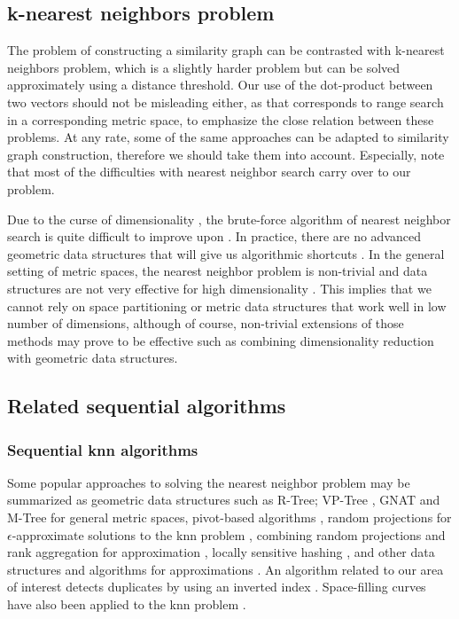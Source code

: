 \documentclass{comjnl}
\begin{document}
\subsection{k-nearest neighbors problem}

The problem of constructing a similarity graph can be contrasted with
k-nearest neighbors problem, which is a slightly harder problem but
can be solved approximately using a distance threshold. Our use of the
dot-product between two vectors should not be misleading either, as
that corresponds to range search in a corresponding metric space, to
emphasize the close relation between these problems.  At any rate,
some of the same approaches can be adapted to similarity graph
construction, therefore we should take them into account. Especially,
note that most of the difficulties with nearest neighbor search carry
over to our problem.

Due to the curse of dimensionality \cite{marimont79}, the brute-force
algorithm of nearest neighbor search is quite difficult to improve
upon \cite{weber1998}. In practice, there are no advanced geometric
data structures that will give us algorithmic shortcuts
\cite{Chavez2001, asano95}. In the general setting of metric spaces,
the nearest neighbor problem is non-trivial and data structures are
not very effective for high dimensionality \cite{clarkson06}.  This
implies that we cannot rely on space partitioning or metric data
structures that work well in low number of dimensions, although of
course, non-trivial extensions of those methods may prove to be
effective such as combining dimensionality reduction with geometric
data structures.

\subsection{Related sequential algorithms}

\subsubsection{Sequential knn algorithms}

Some popular approaches to solving the nearest neighbor problem may be
summarized as geometric data structures such as
R-Tree\cite{Guttman84r-trees}; VP-Tree \cite{Yianilos93}, GNAT
\cite{Brin:1995} and M-Tree \cite{Ciaccia:1997} for general metric
spaces, pivot-based algorithms \cite{Farago:1993,Bustos2010}, random
projections for $\epsilon$-approximate solutions to the knn problem
\cite{Kleinberg1997}, combining random projections and rank
aggregation for approximation \cite{Fagin2003}, locally sensitive
hashing \cite{Gionis1999,Ailon2006,Andoni2008}, and other data
structures and algorithms for approximations
\cite{Kushilevitz1998,Arya94anoptimal}.  An algorithm related to our
area of interest detects duplicates by using an inverted index
\cite{Ilyinsky2002}. Space-filling curves have also been applied to
the knn problem
\cite{rafajlowicz-knn-sfc,Liao00highdimensional,Mainar-Ruiz:2006}.
\end{document}

